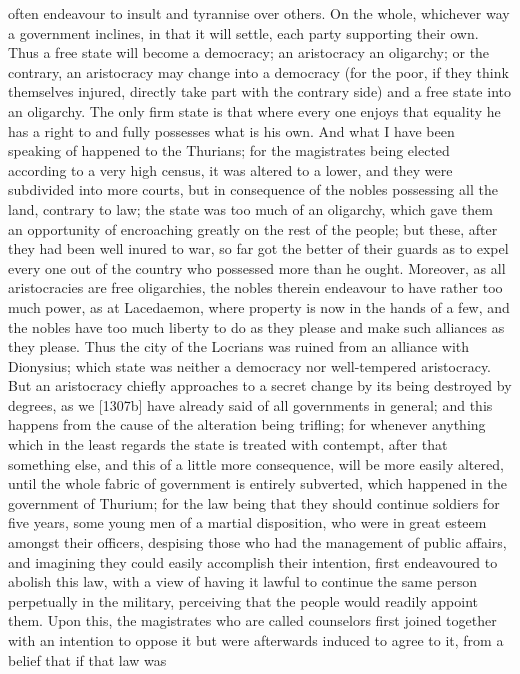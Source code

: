 often endeavour to insult and tyrannise over others. On the whole,
whichever way a government inclines, in that it will settle, each party
supporting their own. Thus a free state will become a democracy; an
aristocracy an oligarchy; or the contrary, an aristocracy may change into
a democracy (for the poor, if they think themselves injured, directly take
part with the contrary side) and a free state into an oligarchy. The only
firm state is that where every one enjoys that equality he has a right to
and fully possesses what is his own. And what I have been speaking of
happened to the Thurians; for the magistrates being elected according to a
very high census, it was altered to a lower, and they were subdivided into
more courts, but in consequence of the nobles possessing all the land,
contrary to law; the state was too much of an oligarchy, which gave them
an opportunity of encroaching greatly on the rest of the people; but
these, after they had been well inured to war, so far got the better of
their guards as to expel every one out of the country who possessed more
than he ought. Moreover, as all aristocracies are free oligarchies, the
nobles therein endeavour to have rather too much power, as at Lacedaemon,
where property is now in the hands of a few, and the nobles have too much
liberty to do as they please and make such alliances as they please. Thus
the city of the Locrians was ruined from an alliance with Dionysius; which
state was neither a democracy nor well-tempered aristocracy. But an
aristocracy chiefly approaches to a secret change by its being destroyed
by degrees, as we [1307b] have already said of all governments in general;
and this happens from the cause of the alteration being trifling; for
whenever anything which in the least regards the state is treated with
contempt, after that something else, and this of a little more
consequence, will be more easily altered, until the whole fabric of
government is entirely subverted, which happened in the government of
Thurium; for the law being that they should continue soldiers for five
years, some young men of a martial disposition, who were in great esteem
amongst their officers, despising those who had the management of public
affairs, and imagining they could easily accomplish their intention, first
endeavoured to abolish this law, with a view of having it lawful to
continue the same person perpetually in the military, perceiving that the
people would readily appoint them. Upon this, the magistrates who are
called counselors first joined together with an intention to oppose it but
were afterwards induced to agree to it, from a belief that if that law was

